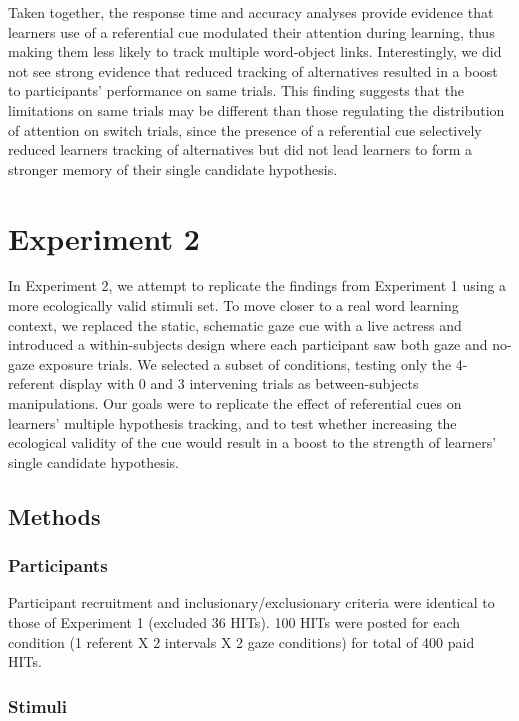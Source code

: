 \documentclass[10pt,letterpaper]{article}
\begin{document}
Taken together, the response time and accuracy analyses provide evidence that learners use of a referential cue modulated their attention during learning, thus making them less likely to track multiple word-object links. Interestingly, we did not see strong evidence that reduced tracking of alternatives resulted in a boost to participants' performance on same trials. This finding suggests that the limitations on same trials may be different than those regulating the distribution of attention on switch trials, since the presence of a referential cue selectively reduced learners tracking of alternatives but did not lead learners to form a stronger memory of their single candidate hypothesis. 


\section{Experiment 2}

In Experiment 2, we attempt to replicate the findings from Experiment 1 using a more ecologically valid stimuli set. To move closer to a real word learning context, we replaced the static, schematic gaze cue with a live actress and introduced a within-subjects design where each participant saw both gaze and no-gaze exposure trials. We selected a subset of conditions, testing only the 4-referent display with 0 and 3 intervening trials as between-subjects manipulations. Our goals were to replicate the effect of referential cues on learners' multiple hypothesis tracking, and to test whether increasing the ecological validity of the cue would result in a boost to the strength of learners' single candidate hypothesis.  

\subsection{Methods}

\subsubsection{Participants}

Participant recruitment and inclusionary/exclusionary criteria were identical to those of Experiment 1  (excluded 36 HITs). 100 HITs were posted for each condition (1 referent X 2 intervals X 2 gaze conditions) for total of 400 paid HITs. 

\subsubsection{Stimuli}
\end{document}
